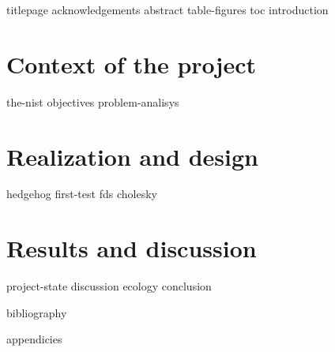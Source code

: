 \documentclass[12pt]{article}
\begin{document}
    {titlepage}
    {acknowledgements}
    {abstract}
    {table-figures}
    {toc}
    {introduction}


    \clearpage{}
    \part{Context of the project}

    {the-nist}
    {objectives}
    {problem-analisys}

    \clearpage{}
    \part{Realization and design}

    {hedgehog}
    {first-test}
    {fds}
    {cholesky}

    \clearpage{}
    \part{Results and discussion}

    {project-state}
    {discussion}
    {ecology}
    {conclusion}


    {bibliography}

    \clearpage{}
    \printglossaries

    {appendicies}
\end{document}
